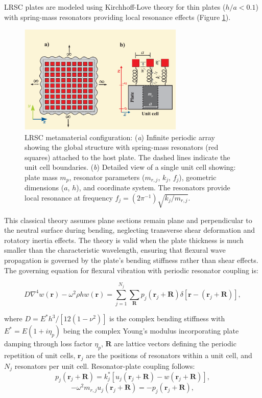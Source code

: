 \documentclass[review,numbers,sort&compress]{elsarticle}
\begin{document}
LRSC plates are modeled using Kirchhoff-Love theory for thin plates ($h/a < 0.1$) with spring-mass resonators providing local resonance effects (Figure \ref{ilustr_inf_panel_cell_unit}). 

\begin{figure}[htb]
	\centering
	\includegraphics[width=0.7\textwidth]{ilustr_inf_panel_cell_unit.pdf}
	\caption{LRSC metamaterial configuration: (\textit{a}) Infinite periodic array showing the global structure with spring-mass resonators (red squares) attached to the host plate. The dashed lines indicate the unit cell boundaries. (\textit{b}) Detailed view of a single unit cell showing: plate mass $m_p$, resonator parameters ($m_{r,j}$, $k_j$, $f_j$), geometric dimensions ($a$, $h$), and coordinate system. The resonators provide local resonance at frequency $f_j = {(2\pi^{-1})}\sqrt{k_j/m_{r,j}}$.}
	\label{ilustr_inf_panel_cell_unit}
\end{figure}

This classical theory assumes plane sections remain plane and perpendicular to the neutral surface during bending, neglecting transverse shear deformation and rotatory inertia effects. The theory is valid when the plate thickness is much smaller than the characteristic wavelength, ensuring that flexural wave propagation is governed by the plate's bending stiffness rather than shear effects. 
The governing equation for flexural vibration with periodic resonator coupling is:  

\begin{equation}
D\nabla^4 w(\mathbf{r}) - \omega^2 \rho h w(\mathbf{r}) = \sum_{j=1}^{N_j} \sum_{\mathbf{R}} p_j(\mathbf{r}_j + \mathbf{R}) \delta[\mathbf{r} - (\mathbf{r}_j + \mathbf{R})], 
\label{eq_kirchoff_fourrier}
\end{equation}

where $D = E^*h^3/[12(1-\nu^2)]$ is the complex bending stiffness with $E^* = E(1 + i\eta_p)$ being the complex Young's modulus incorporating plate damping through loss factor $\eta_p$, $\mathbf{R}$ are lattice vectors defining the periodic repetition of unit cells, $\mathbf{r}_j$ are the positions of resonators within a unit cell, and $N_j$ resonators per unit cell. Resonator-plate coupling follows:
\begin{equation}
p_j(\mathbf{r}_j + \mathbf{R}) = k_j^*[u_j(\mathbf{r}_j + \mathbf{R}) - w(\mathbf{r}_j + \mathbf{R})],
\label{eq_plate_disp1}
\end{equation}
\begin{equation}
-\omega^2 m_{r,j} u_j(\mathbf{r}_j + \mathbf{R}) = -p_j(\mathbf{r}_j + \mathbf{R}),
\label{eq_plate_disp2}
\end{equation}
\end{document}
